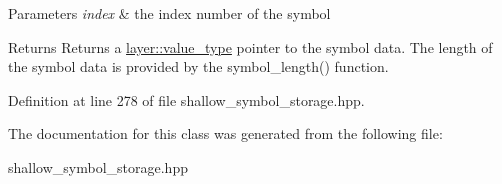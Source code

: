 \begin{DoxyParams}{Parameters}
{\em index} & the index number of the symbol \\
\hline
\end{DoxyParams}
\begin{DoxyReturn}{Returns}
Returns a \hyperlink{classlayer_a3ad6d6930927932e5c25f2a2b5277cc0}{layer\-::value\-\_\-type} pointer to the symbol data. The length of the symbol data is provided by the symbol\-\_\-length() function. 
\end{DoxyReturn}


Definition at line 278 of file shallow\-\_\-symbol\-\_\-storage.\-hpp.



The documentation for this class was generated from the following file\-:\begin{DoxyCompactItemize}
\item 
shallow\-\_\-symbol\-\_\-storage.\-hpp\end{DoxyCompactItemize}
